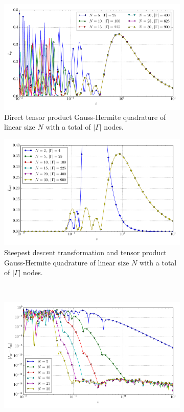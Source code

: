 \documentclass[a4paper,10pt]{article}
\begin{document}
\begin{figure}[ht!]
  \begin{subfigure}[t]{0.5\linewidth}
    \includegraphics[width=\linewidth]{./plots/tp_2d_conv_eps_(2,3)_(2,2)_val_qr.pdf}
    \caption{Direct tensor product Gauss-Hermite quadrature of linear size $N$ with a total of $|\Gamma|$ nodes.}
    \label{fig:tp_2d_conv_eps_23_22_val_qr}
  \end{subfigure}
  \begin{subfigure}[t]{0.5\linewidth}
    \includegraphics[width=\linewidth]{./plots/tp_2d_conv_eps_(2,3)_(2,2)_val_nsd.pdf}
    \caption{Steepest descent transformation and tensor product Gauss-Hermite quadrature of linear size $N$ with a total of $|\Gamma|$ nodes.}
    \label{fig:tp_2d_conv_eps_23_22_val_nsd}
  \end{subfigure} \\
  \begin{subfigure}[t]{0.5\linewidth}
    \includegraphics[width=\linewidth]{./plots/tp_2d_conv_eps_(2,3)_(2,2)_err_qr.pdf}

\end{subfigure}
\end{figure}
\end{document}
